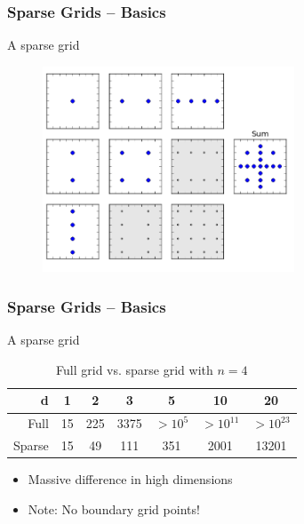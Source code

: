\begin{frame}
  \frametitle{Sparse Grids -- Basics}
  \topline
  \vspace{-10px}
  \begin{block}{A sparse grid}
    \begin{figure}[!htp]
      \centering
      \includegraphics[width=7.5cm]{images/sparsegrid_hirach2}
      \vspace{-12px}
      \caption{}
    \end{figure}
  \end{block}
\end{frame}


\begin{frame}
  \frametitle{Sparse Grids -- Basics}
  \topline
  \vspace{-10px}
  \begin{block}{A sparse grid}
    \begin{table}[h]
      \centering
      \begin{tabular}{r | c | c | c | c | c | c}
        d & 1 & 2 & 3 & 5 & 10 & 20 \\
        \hline\hline
        Full & 15 &  225 & 3375 & $>10^5$ & $> 10^{11}$ & $> 10^{23}$ \\
        \hline
        Sparse & 15 & 49 & 111 & 351 & 2001 & 13201 \\
      \end{tabular}
      \caption{Full grid vs. sparse grid with $n = 4$}
    \end{table}
    \begin{itemize}
    \item Massive difference in high dimensions
    \item Note: No boundary grid points!
    \end{itemize}
  \end{block}
\end{frame}


